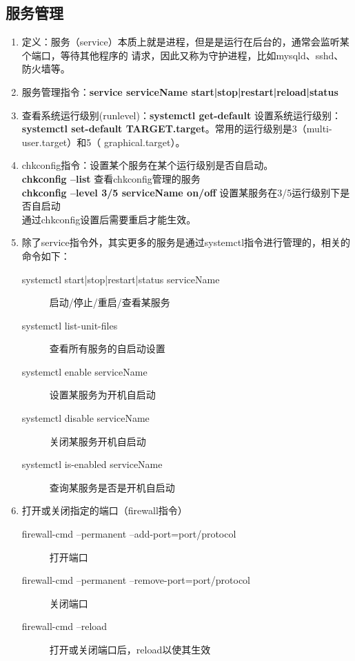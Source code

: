 \documentclass[11pt]{article}
\begin{document}
\subsection{服务管理}
\begin{enumerate}
\item 定义：服务（service）本质上就是进程，但是是运行在后台的，通常会监听某个端口，等待其他程序的
请求，因此又称为守护进程，比如mysqld、sshd、防火墙等。 \\
\item 服务管理指令：\textbf{service serviceName start|stop|restart|reload|status}  \\
\item 查看系统运行级别(runlevel)：\textbf{systemctl get-default} \quad 设置系统运行级别：
\textbf{systemctl set-default TARGET.target}。常用的运行级别是3（multi-user.target）和5（
graphical.target）。  \\
\item chkconfig指令：设置某个服务在某个运行级别是否自启动。 \\
\textbf{chkconfig --list} \quad 查看chkconfig管理的服务  \\
\textbf{chkconfig --level 3/5 serviceName on/off} \quad 设置某服务在3/5运行级别下是否自启动 \\
通过chkconfig设置后需要重启才能生效。
\item 除了service指令外，其实更多的服务是通过systemctl指令进行管理的，相关的命令如下：
\begin{description}
    \item[systemctl start|stop|restart|status serviceName] 启动/停止/重启/查看某服务
    \item[systemctl list-unit-files] 查看所有服务的自启动设置
    \item[systemctl enable serviceName] 设置某服务为开机自启动
    \item[systemctl disable serviceName] 关闭某服务开机自启动
    \item[systemctl is-enabled serviceName] 查询某服务是否是开机自启动
\end{description}
\item 打开或关闭指定的端口（firewall指令）
\begin{description}
    \item[firewall-cmd --permanent --add-port=port/protocol] 打开端口
    \item[firewall-cmd --permanent --remove-port=port/protocol] 关闭端口
    \item[firewall-cmd --reload] 打开或关闭端口后，reload以使其生效

\end{description}
\end{enumerate}
\end{document}
